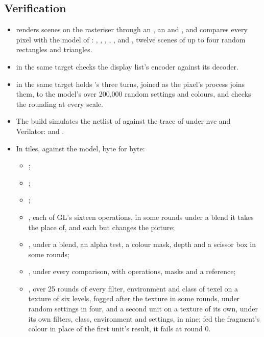 \subsection*{Verification}

\begin{itemize}
\item {} renders scenes on the rasteriser through
an , an  and , and compares every
pixel with the model of :
,
,
,
\allowbreak{},
, and
, twelve scenes of
up to four random rectangles and triangles.
\item {} in the same target
checks the display list's encoder against its decoder.
\item {} in the same target
holds 's three turns, joined as the pixel's process joins
them, to the model's  over 200,000 random settings
and colours, and  checks the rounding
at every scale.
\item The build simulates the netlist of  against the trace of  under nvc and
Verilator:  and
.
\item In tiles, against the model, byte for byte:
\begin{itemize}
\item {};
\item {};
\item {};
\item {}, each of GL's
sixteen operations, in some rounds under a blend it takes the place
of, and each but  changes the picture;
\item {}, under a blend, an alpha
test, a colour mask, depth and a scissor box in some rounds;
\item {}, under every
comparison, with operations, masks and a reference;
\item {}, over 25 rounds of
every filter, environment and class of texel on a texture of six
levels, fogged after the texture in some rounds, 
under random settings in four, and a second unit on a texture of its
own, under its own filters, class, environment and 
settings, in nine; fed the fragment's colour in place of the first
unit's result, it fails at round 0.


\end{itemize}
\end{itemize}
